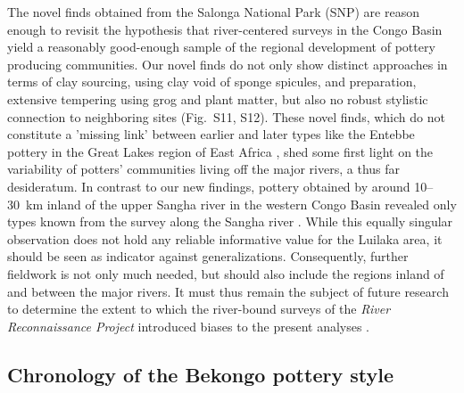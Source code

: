 \documentclass[preprint,10pt,oneside,onecolumn,authoryear]{elsarticle}
\begin{document}
The novel finds obtained from the Salonga National Park (SNP) are reason enough to revisit the hypothesis that river-centered surveys in the Congo Basin yield a reasonably good-enough sample of the regional development of pottery producing communities. Our novel finds do not only show distinct approaches in terms of clay sourcing, using clay void of sponge spicules, and preparation, extensive tempering using grog and plant matter, but also no robust stylistic connection to neighboring sites (Fig.~S11, S12). These novel finds, which do not constitute a 'missing link' between earlier and later types like the Entebbe pottery in the Great Lakes region of East Africa \citep{Ashley.2010,Reid.2013}, shed some first light on the variability of potters' communities living off the major rivers, a thus far desideratum. In contrast to our new findings, pottery obtained by \citet[113--114 Fig.~42]{Gillet.2013} around 10--30~km inland of the upper Sangha river in the western Congo Basin revealed only types known from the survey along the Sangha river \citep{Seidensticker.2021e}. While this equally singular observation does not hold any reliable informative value for the Luilaka area, it should be seen as indicator against generalizations. Consequently, further fieldwork is not only much needed, but should also include the regions inland of and between the major rivers. It must thus remain the subject of future research to determine the extent to which the river-bound surveys of the \textit{River Reconnaissance Project} introduced biases to the present analyses \citep{Wotzka.1995,Seidensticker.2021e}.

\subsection{Chronology of the Bekongo pottery style}
\end{document}

